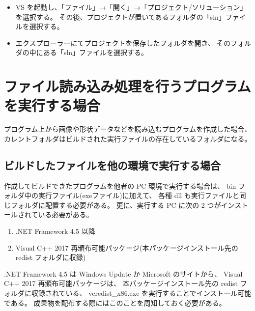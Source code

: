 \documentclass[a4paper]{jsarticle}
\begin{document}
\begin{itemize}
 \item VS を起動し、「ファイル」→「開く」→「プロジェクト/ソリューション」を選択する。
	その後、プロジェクトが置いてあるフォルダの「sln」ファイルを選択する。

 \item エクスプローラーにてプロジェクトを保存したフォルダを開き、
	そのフォルダの中にある「sln」ファイルを選択する。
\end{itemize}

\section{ファイル読み込み処理を行うプログラムを実行する場合}
プログラム上から画像や形状データなどを読み込むプログラムを作成した場合、
カレントフォルダはビルドされた実行ファイルの存在しているフォルダになる。

\subsection{ビルドしたファイルを他の環境で実行する場合}
作成してビルドできたプログラムを他者の PC 環境で実行する場合は、
bin フォルダ中の実行ファイル(exeファイル)に加えて、
各種 dll も実行ファイルと同じフォルダに配置する必要がある。
更に、実行する PC に次の 2 つがインストールされている必要がある。

\begin{enumerate}
\item .NET Framework 4.5 以降
\item Visual C++ 2017 再頒布可能パッケージ(本パッケージインストール先の redist フォルダに収録)
\end{enumerate}

.NET Framework 4.5 は Windows Update か Microsoft のサイトから、
Visual C++ 2017 再頒布可能パッケージは、
本パッケージインストール先の redist フォルダに収録されている、
vcredist\_x86.exe を実行することでインストール可能である。
成果物を配布する際にはこのことを周知しておく必要がある。
\end{document}
